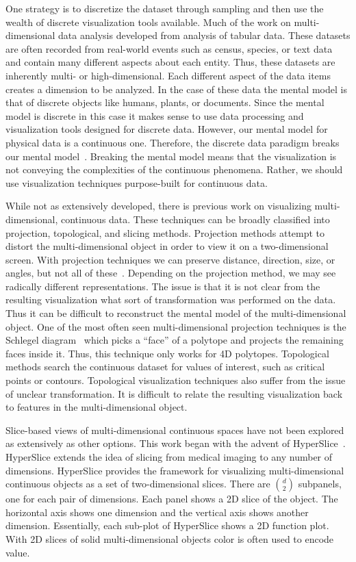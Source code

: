 One strategy is to discretize the dataset through sampling and then use the
wealth of discrete visualization tools available. Much of the work on
multi-dimensional data analysis developed from analysis of 
tabular data. These datasets are often recorded from real-world
events such as census, species, or text data and contain many different aspects
about each entity. Thus, these datasets are inherently multi- or high-dimensional.
Each different aspect of the data items creates a dimension to be analyzed. 
In the case of these data the mental model is that of discrete objects
like humans, plants, or documents. Since the mental model is discrete in this
case it makes sense to use data processing and visualization tools designed for
discrete data.  However, our mental model for physical data is a continuous 
one. Therefore, the
discrete data paradigm breaks our mental model~\cite{Tory:2004a,Liu:2010a}. 
Breaking the mental model means that the visualization is not conveying the
complexities of the continuous phenomena.
Rather, we
should use visualization techniques purpose-built for continuous data.

While not as
extensively developed, there is previous work on visualizing multi-dimensional,
continuous data. These techniques can be broadly classified into projection,
topological, and slicing methods.   Projection methods attempt to
distort the multi-dimensional object in order to view it on a two-dimensional
screen. With projection techniques we can preserve distance, direction, size,
or angles, but not all of 
these~\cite{Snyder:1987}. 
Depending on the
projection method, we may see radically different representations.  The issue
is that it is not clear from the resulting visualization what sort of
transformation was performed on the data.  Thus it can be difficult to
reconstruct the mental model of the multi-dimensional object.  One of the most
often seen multi-dimensional projection techniques is the Schlegel
diagram~\cite{Sommerville:1929} which picks a ``face'' of a polytope and projects the
remaining faces inside it. Thus, this technique only works for 4D polytopes.
Topological methods search the continuous dataset for values of interest, such
as critical points or contours.  Topological visualization techniques also
suffer from the issue of unclear transformation. It is difficult to relate the
resulting visualization back to features in the multi-dimensional object.

Slice-based views of multi-dimensional continuous spaces have not been explored
as extensively as other options.  This work began with the advent of
HyperSlice~\cite{Wijk:1993}.  HyperSlice extends the idea of slicing from
medical imaging to any number of dimensions.  HyperSlice provides the framework
for visualizing multi-dimensional continuous objects as a set of
two-dimensional slices.  There are $d \choose 2$ subpanels, one for each pair
of dimensions. Each panel shows a 2D slice of the object. The horizontal axis
shows one dimension and the vertical axis shows another dimension. Essentially,
each sub-plot of HyperSlice shows a 2D function plot. With 2D slices of solid
multi-dimensional objects color is often used to encode value. 

